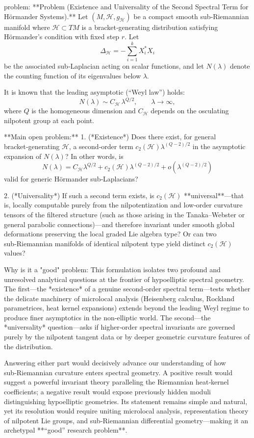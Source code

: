 problem:  
**Problem (Existence and Universality of the Second Spectral Term for Hörmander Systems).**  
Let \( (M, \mathcal H, g_{\mathcal H}) \) be a compact smooth sub‑Riemannian manifold where \( \mathcal H\subset TM \) is a bracket‑generating distribution satisfying Hörmander’s condition with fixed step \(r\). Let  
\[
\Delta_{\mathcal H} = -\sum_{i=1}^k X_i^*X_i
\]
be the associated sub‑Laplacian acting on scalar functions, and let \(N(\lambda)\) denote the counting function of its eigenvalues below \(\lambda\).

It is known that the leading asymptotic (“Weyl law”) holds:
\[
N(\lambda) \sim C_{\mathcal H}\,\lambda^{Q/2}, \qquad \lambda\to\infty,
\]
where \(Q\) is the homogeneous dimension and \(C_{\mathcal H}\) depends on the osculating nilpotent group at each point.

**Main open problem:**  
1. (*Existence*) Does there exist, for general bracket‑generating \(\mathcal H\), a second‑order term \(c_2(\mathcal H)\lambda^{(Q-2)/2}\) in the asymptotic expansion of \(N(\lambda)\)? In other words, is
\[
N(\lambda) = C_{\mathcal H}\lambda^{Q/2} + c_2(\mathcal H)\lambda^{(Q-2)/2} + o(\lambda^{(Q-2)/2})
\]
valid for generic Hörmander sub‑Laplacians?

2. (*Universality*) If such a second term exists, is \(c_2(\mathcal H)\) **universal**—that is, locally computable purely from the nilpotentization and low‑order curvature tensors of the filtered structure (such as those arising in the Tanaka–Webster or general parabolic connections)—and therefore invariant under smooth global deformations preserving the local graded Lie algebra type?  
Or can two sub‑Riemannian manifolds of identical nilpotent type yield distinct \(c_2(\mathcal H)\) values?

Why is it a "good" problem:  
This formulation isolates two profound and unresolved analytical questions at the frontier of hypoelliptic spectral geometry.  
The first—the *existence* of a genuine second‑order spectral term—tests whether the delicate machinery of microlocal analysis (Heisenberg calculus, Rockland parametrices, heat kernel expansions) extends beyond the leading Weyl regime to produce finer asymptotics in the non‑elliptic world.  
The second—the *universality* question—asks if higher‑order spectral invariants are governed purely by the nilpotent tangent data or by deeper geometric curvature features of the distribution.  

Answering either part would decisively advance our understanding of how sub‑Riemannian curvature enters spectral geometry. A positive result would suggest a powerful invariant theory paralleling the Riemannian heat‑kernel coefficients; a negative result would expose previously hidden moduli distinguishing hypoelliptic geometries.  
Its statement remains simple and natural, yet its resolution would require uniting microlocal analysis, representation theory of nilpotent Lie groups, and sub‑Riemannian differential geometry—making it an archetypal **“good” research problem**.
